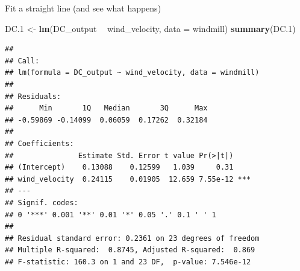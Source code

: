 \documentclass[
  ignorenonframetext,
]{beamer}
\newenvironment{Shaded}{\begin{snugshade}}{\end{snugshade}}
\newcommand{\DataTypeTok}[1]{\textcolor[rgb]{0.13,0.29,0.53}{#1}}
\newcommand{\FloatTok}[1]{\textcolor[rgb]{0.00,0.00,0.81}{#1}}
\newcommand{\KeywordTok}[1]{\textcolor[rgb]{0.13,0.29,0.53}{\textbf{#1}}}
\newcommand{\NormalTok}[1]{#1}
\newcommand{\OperatorTok}[1]{\textcolor[rgb]{0.81,0.36,0.00}{\textbf{#1}}}
\newcommand{\StringTok}[1]{\textcolor[rgb]{0.31,0.60,0.02}{#1}}
\begin{document}
\begin{frame}[fragile]{Fit a straight line (and see what happens)}
\protect\hypertarget{fit-a-straight-line-and-see-what-happens}{}

\footnotesize

\begin{Shaded}
\begin{Highlighting}[]
\NormalTok{DC}\FloatTok{.1}\NormalTok{ <-}\StringTok{ }\KeywordTok{lm}\NormalTok{(DC_output }\OperatorTok{~}\StringTok{ }\NormalTok{wind_velocity, }\DataTypeTok{data =}\NormalTok{ windmill)}
\KeywordTok{summary}\NormalTok{(DC}\FloatTok{.1}\NormalTok{)}
\end{Highlighting}
\end{Shaded}

\begin{verbatim}
## 
## Call:
## lm(formula = DC_output ~ wind_velocity, data = windmill)
## 
## Residuals:
##      Min       1Q   Median       3Q      Max 
## -0.59869 -0.14099  0.06059  0.17262  0.32184 
## 
## Coefficients:
##               Estimate Std. Error t value Pr(>|t|)    
## (Intercept)    0.13088    0.12599   1.039     0.31    
## wind_velocity  0.24115    0.01905  12.659 7.55e-12 ***
## ---
## Signif. codes:  
## 0 '***' 0.001 '**' 0.01 '*' 0.05 '.' 0.1 ' ' 1
## 
## Residual standard error: 0.2361 on 23 degrees of freedom
## Multiple R-squared:  0.8745, Adjusted R-squared:  0.869 
## F-statistic: 160.3 on 1 and 23 DF,  p-value: 7.546e-12
\end{verbatim}

\normalsize

\end{frame}
\end{document}
